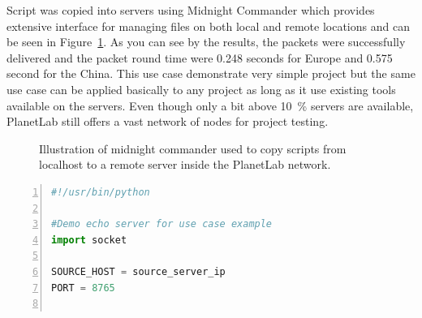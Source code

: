 {{{{{{{Script was copied into servers using Midnight Commander which provides extensive interface for managing files on both local and remote locations and can be seen in Figure~\ref{fig:midnightcommander}. As you can see by the results, the packets were successfully delivered and the packet round time were 0.248 seconds for Europe and 0.575 second for the China. This use case demonstrate very simple project but the same use case can be applied basically to any project as long as it use existing tools available on the servers. Even though only a bit above \SI{10}{\percent} servers are available, PlanetLab still offers a vast network of nodes for project testing. 

\begin{figure}[H]
	\centering
	\caption{Illustration of midnight commander used to copy scripts from localhost to a remote server inside the PlanetLab network.}
	\label{fig:midnightcommander}
\end{figure}

{\noindent\begin{minipage}{\linewidth}
		\begin{lstlisting}[language=Python, numbers=left, label={lst:echoserver}, caption=Code of echo server., frame=single, showstringspaces=false, keywordstyle=\color{blue},captionpos=b]
#!/usr/bin/python

#Demo echo server for use case example
import socket

SOURCE_HOST = source_server_ip
PORT = 8765


\end{lstlisting}
\end{minipage}}}}}}}}}
